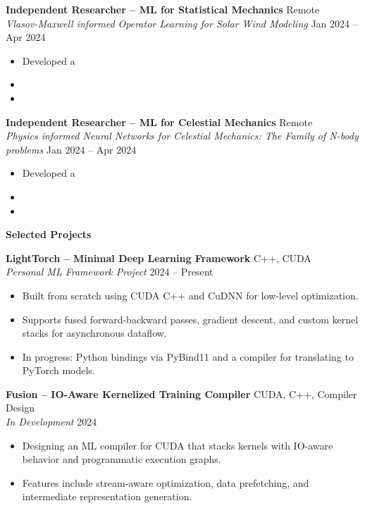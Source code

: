 \documentclass[11pt]{article}
\begin{document}
\textbf{Independent Researcher – ML for Statistical Mechanics} \hfill Remote \\
\textit{Vlasov-Maxwell informed Operator Learning for Solar Wind Modeling} \hfill Jan 2024 – Apr 2024
\begin{itemize}[noitemsep]
    \item Developed a
    \item
    \item
\end{itemize}

\textbf{Independent Researcher – ML for Celestial Mechanics} \hfill Remote \\
\textit{Physics informed Neural Networks for Celestial Mechanics: The Family of N-body problems} \hfill Jan 2024 – Apr 2024
\begin{itemize}[noitemsep]
    \item Developed a
    \item
    \item
\end{itemize}

\begin{center}
    \textbf{Selected Projects}
\end{center}

\textbf{LightTorch – Minimal Deep Learning Framework} \hfill C++, CUDA \\
\textit{Personal ML Framework Project} \hfill 2024 – Present
\begin{itemize}[noitemsep]
    \item Built from scratch using CUDA C++ and CuDNN for low-level optimization.
    \item Supports fused forward-backward passes, gradient descent, and custom kernel stacks for asynchronous dataflow.
    \item In progress: Python bindings via PyBind11 and a compiler for translating to PyTorch models.
\end{itemize}

\textbf{Fusion – IO-Aware Kernelized Training Compiler} \hfill CUDA, C++, Compiler Design \\
\textit{In Development} \hfill 2024
\begin{itemize}[noitemsep]
    \item Designing an ML compiler for CUDA that stacks kernels with IO-aware behavior and programmatic execution graphs.
    \item Features include stream-aware optimization, data prefetching, and intermediate representation generation.
\end{itemize}
\end{document}
